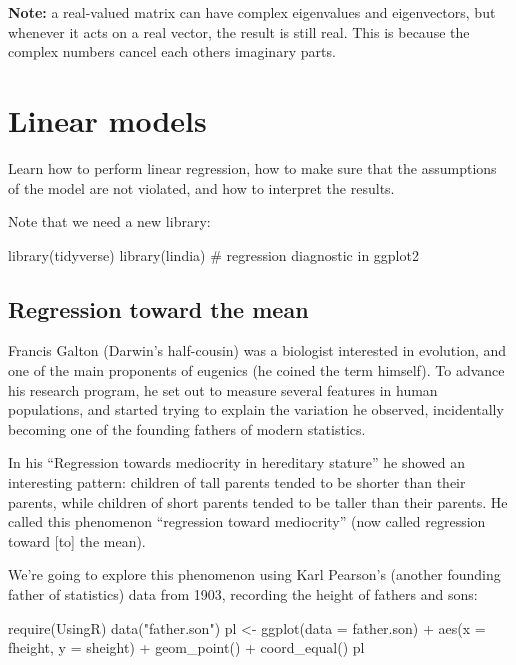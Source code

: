\documentclass[
  letterpaper,
  DIV=11,
  numbers=noendperiod]{scrreprt}
\newenvironment{Shaded}{\begin{snugshade}}{\end{snugshade}}
\newcommand{\AttributeTok}[1]{\textcolor[rgb]{0.40,0.45,0.13}{#1}}
\newcommand{\CommentTok}[1]{\textcolor[rgb]{0.37,0.37,0.37}{#1}}
\newcommand{\FunctionTok}[1]{\textcolor[rgb]{0.28,0.35,0.67}{#1}}
\newcommand{\NormalTok}[1]{\textcolor[rgb]{0.00,0.23,0.31}{#1}}
\newcommand{\OtherTok}[1]{\textcolor[rgb]{0.00,0.23,0.31}{#1}}
\newcommand{\SpecialCharTok}[1]{\textcolor[rgb]{0.37,0.37,0.37}{#1}}
\newcommand{\StringTok}[1]{\textcolor[rgb]{0.13,0.47,0.30}{#1}}
\begin{document}
\textbf{Note:} a real-valued matrix can have complex eigenvalues and
eigenvectors, but whenever it acts on a real vector, the result is still
real. This is because the complex numbers cancel each others imaginary
parts.


\hypertarget{linear-models}{%
\chapter{Linear models}\label{linear-models}}

Learn how to perform linear regression, how to make sure that the
assumptions of the model are not violated, and how to interpret the
results.

Note that we need a new library:

\begin{Shaded}
\begin{Highlighting}[]
\FunctionTok{library}\NormalTok{(tidyverse)}
\FunctionTok{library}\NormalTok{(lindia) }\CommentTok{\# regression diagnostic in ggplot2}
\end{Highlighting}
\end{Shaded}

\hypertarget{regression-toward-the-mean}{%
\section{Regression toward the mean}\label{regression-toward-the-mean}}

Francis Galton (Darwin's half-cousin) was a biologist interested in
evolution, and one of the main proponents of eugenics (he coined the
term himself). To advance his research program, he set out to measure
several features in human populations, and started trying to explain the
variation he observed, incidentally becoming one of the founding fathers
of modern statistics.

In his ``Regression towards mediocrity in hereditary stature'' he showed
an interesting pattern: children of tall parents tended to be shorter
than their parents, while children of short parents tended to be taller
than their parents. He called this phenomenon ``regression toward
mediocrity'' (now called regression toward {[}to{]} the mean).

We're going to explore this phenomenon using Karl Pearson's (another
founding father of statistics) data from 1903, recording the height of
fathers and sons:

\begin{Shaded}
\begin{Highlighting}[]
\FunctionTok{require}\NormalTok{(UsingR)}
\FunctionTok{data}\NormalTok{(}\StringTok{"father.son"}\NormalTok{)}
\NormalTok{pl }\OtherTok{\textless{}{-}} \FunctionTok{ggplot}\NormalTok{(}\AttributeTok{data =}\NormalTok{ father.son) }\SpecialCharTok{+} \FunctionTok{aes}\NormalTok{(}\AttributeTok{x =}\NormalTok{ fheight, }\AttributeTok{y =}\NormalTok{ sheight) }\SpecialCharTok{+} \FunctionTok{geom\_point}\NormalTok{() }\SpecialCharTok{+} \FunctionTok{coord\_equal}\NormalTok{()}
\NormalTok{pl}
\end{Highlighting}
\end{Shaded}
\end{document}
